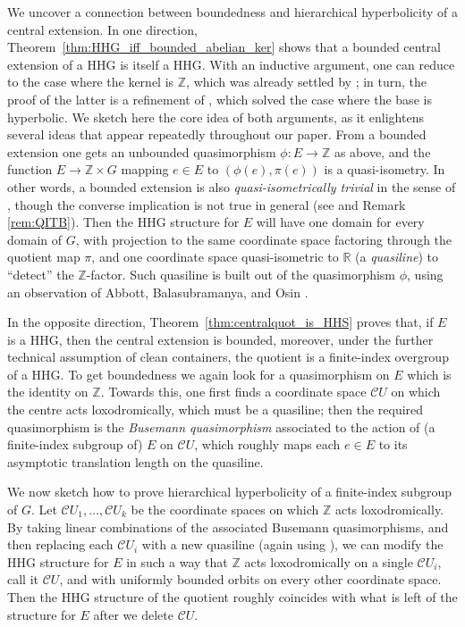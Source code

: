 \documentclass[svgnames]{amsart}
\theoremstyle{plain}
\theoremstyle{definition}
\newcommand{\cal}[1]{\mathcal{#1}}
\newcommand{\Z}{\mathbb{Z}}
\newcommand{\R}{\mathbb{R}}
\newcommand{\C}{\cal C}
\begin{document}
We uncover a connection between boundedness and hierarchical hyperbolicity of a central extension. In one direction, Theorem~\ref{thm:HHG_iff_bounded_abelian_ker} shows that a bounded central extension of a HHG is itself a HHG. With an inductive argument, one can reduce to the case where the kernel is $\Z$, which was already settled by \cite[Theorem 5.14]{uniform_undistortion}; in turn, the proof of the latter is a refinement of \cite[Corollary 4.3]{HRSS_3manifold}, which solved the case where the base is hyperbolic. We sketch here the core idea of both arguments, as it enlightens several ideas that appear repeatedly throughout our paper. From a bounded extension one gets an unbounded quasimorphism $\phi\colon E\to \Z$ as above, and the function $E\to \Z\times G$ mapping $e\in E$ to $(\phi(e),\pi(e))$ is a quasi-isometry. In other words, a bounded extension is also \emph{quasi-isometrically trivial} in the sense of \cite{Gersten_B_is_QIT}, though the converse implication is not true in general (see \cite{frigsisto, ascarimilizia} and Remark \ref{rem:QITB}). Then the HHG structure for $E$ will have one domain for every domain of $G$, with projection to the same coordinate space factoring through the quotient map $\pi$, and one coordinate space quasi-isometric to $\R$ (a \emph{quasiline}) to ``detect'' the $\Z$-factor. Such quasiline is built out of the quasimorphism $\phi$, using an observation of Abbott, Balasubramanya, and Osin \cite[Lemma 4.15]{ABO}.
\par\medskip
In the opposite direction, Theorem~\ref{thm:centralquot_is_HHS} proves that, if $E$ is a HHG, then the central extension is bounded, moreover, under the further technical assumption of clean containers, the quotient is a finite-index overgroup of a HHG. To get boundedness we again look for a quasimorphism on $E$ which is the identity on $\Z$. Towards this, one first finds a coordinate space $\C U$ on which the centre acts loxodromically, which must be a quasiline; then the required quasimorphism is the \emph{Busemann quasimorphism} \cite[Section 4.1]{Manning_actions_on_hyp} associated to the action of (a finite-index subgroup of) $E$ on $\C U$, which roughly maps each $e\in E$ to its asymptotic translation length on the quasiline. 

We now sketch how to prove hierarchical hyperbolicity of a finite-index subgroup of $G$. Let $\C U_1,\ldots,\C U_k$ be the coordinate spaces on which $\Z$ acts loxodromically. By taking linear combinations of the associated Busemann quasimorphisms, and then replacing each $\C U_i$ with a new quasiline (again using \cite[Lemma 4.15]{ABO}), we can modify the HHG structure for $E$ in such a way that $\Z$ acts loxodromically on a single $\C U_i$, call it $\C U$, and with uniformly bounded orbits on every other coordinate space. Then the HHG structure of the quotient roughly coincides with what is left of the structure for $E$ after we delete $\C U$. 
\end{document}

